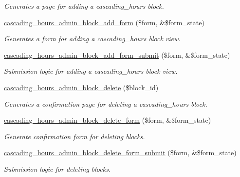 \begin{DoxyCompactItemize}
\begin{DoxyCompactList}\small\item\em Generates a page for adding a cascading\+\_\+hours block. \end{DoxyCompactList}\item 
\hyperlink{cascading__hours_8admin_8php_a4e53033d3b175cd059946d2f9ba34102_a4e53033d3b175cd059946d2f9ba34102}{cascading\+\_\+hours\+\_\+admin\+\_\+block\+\_\+add\+\_\+form} (\$form, \&\$form\+\_\+state)
\begin{DoxyCompactList}\small\item\em Generates a form for adding a cascading\+\_\+hours block view. \end{DoxyCompactList}\item 
\hyperlink{cascading__hours_8admin_8php_a1251f3753454830feb3047560bc10830_a1251f3753454830feb3047560bc10830}{cascading\+\_\+hours\+\_\+admin\+\_\+block\+\_\+add\+\_\+form\+\_\+submit} (\$form, \&\$form\+\_\+state)
\begin{DoxyCompactList}\small\item\em Submission logic for adding a cascading\+\_\+hours block view. \end{DoxyCompactList}\item 
\hyperlink{cascading__hours_8admin_8php_a3820e88e46716d1b6a433742aa226a59_a3820e88e46716d1b6a433742aa226a59}{cascading\+\_\+hours\+\_\+admin\+\_\+block\+\_\+delete} (\$block\+\_\+id)
\begin{DoxyCompactList}\small\item\em Generates a confirmation page for deleting a cascading\+\_\+hours block. \end{DoxyCompactList}\item 
\hyperlink{cascading__hours_8admin_8php_a6764f701c15efdda01d5ab24352829c5_a6764f701c15efdda01d5ab24352829c5}{cascading\+\_\+hours\+\_\+admin\+\_\+block\+\_\+delete\+\_\+form} (\$form, \&\$form\+\_\+state)
\begin{DoxyCompactList}\small\item\em Generate confirmation form for deleting blocks. \end{DoxyCompactList}\item 
\hyperlink{cascading__hours_8admin_8php_a6191d24bb9c3312985be4f6f6fd6f7ba_a6191d24bb9c3312985be4f6f6fd6f7ba}{cascading\+\_\+hours\+\_\+admin\+\_\+block\+\_\+delete\+\_\+form\+\_\+submit} (\$form, \&\$form\+\_\+state)
\begin{DoxyCompactList}\small\item\em Submission logic for deleting blocks. \end{DoxyCompactList}\item 

\end{DoxyCompactItemize}
